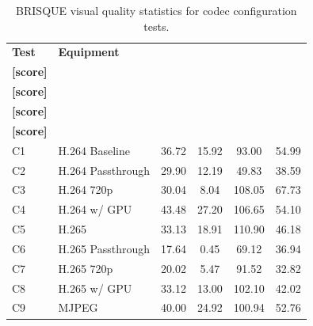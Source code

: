 \begin{table}[H]
    \centering
    \caption{BRISQUE visual quality statistics for codec configuration tests.}\label{tab:quality_codec}
    \begin{tabular}{|l|l|c|c|c|c|}
    \hline
    \textbf{Test} & \textbf{Equipment} & \shortstack{\textbf{Mean}\\ \textbf{[score]}} & \shortstack{\textbf{Min}\\ \textbf{[score]}} & \shortstack{\textbf{Max}\\ \textbf{[score]}} & \shortstack{\textbf{95p}\\ \textbf{[score]}}\\
    \hline
    C1 & H.264 Baseline & 36.72 & 15.92 & 93.00 & 54.99\\
    \hline
    C2 & H.264 Passthrough & 29.90 & 12.19 & 49.83 & 38.59\\
    \hline
    C3 & H.264 720p & 30.04 & 8.04 & 108.05 & 67.73\\
    \hline
    C4 & H.264 w/ GPU & 43.48 & 27.20 & 106.65 & 54.10\\
    \hline
    C5 & H.265 & 33.13 & 18.91 & 110.90 & 46.18\\
    \hline
    C6 & H.265 Passthrough & 17.64 & 0.45 & 69.12 & 36.94\\
    \hline
    C7 & H.265 720p & 20.02 & 5.47 & 91.52 & 32.82\\
    \hline
    C8 & H.265 w/ GPU & 33.12 & 13.00 & 102.10 & 42.02\\
    \hline
    C9 & MJPEG & 40.00 & 24.92 & 100.94 & 52.76\\
    \hline
    \end{tabular}
\end{table}
